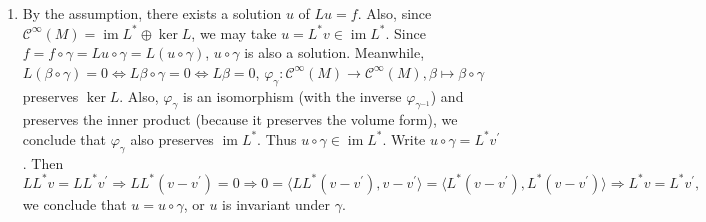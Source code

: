 \begin{enumerate}
On the other hand, by 6.16(15),
\[\operatorname{const}\|\varphi_{n}\|_{1}^{2} \leq\|\varphi_{n}\|^{2}
+\left\|\frac{\partial \varphi_{n}}{\partial x}\right\|^{2}
+\left\|\frac{\partial \varphi_{n}}{\partial y}\right\|^{2}.\]
Since $\{\varphi_{n}\}$ is monotonically increasing, 
\[\|\varphi_{n}\|^{2} \rightarrow \int_{r \leq \frac{1}{2}}\left(\log \log \frac{1}{r}\right)^{2} dx dy<\infty\]
by the monotone convergence theorem. Also,
\[\frac{\partial \varphi_{n}}{\partial x}=\frac{x}{r\left(\frac{1}{n}+r\right)\log \left(\frac{1}{n}+r\right)}\]
and we can use a similar argument to see that
\[\left\|\frac{\partial \varphi_{n}}{\partial x}\right\|^{2} 
\rightarrow \int_{r \leq \frac{1}{2}}\left(\frac{x}{r^{2} \log r}\right)^{2} dx dy=\frac{\pi}{\log 2}.\]
Similarly,
\[\left\|\frac{\partial \varphi_{n}}{\partial y}\right\|^{2} \rightarrow \frac{\pi}{\log 2}.\]
Thus $\|\varphi_{n}\|_{1}$ is bounded and there is no constant $c$ satisfying the given condition.
\item By the assumption, there exists a solution $u$ of $Lu=f$. 
Also, since $\mathcal{C}^{\infty}(M)=\operatorname{im} L^{*} \oplus \ker L$, 
we may take $u=L^{*} v \in \operatorname{im} L^{*}$. 
Since $f=f \circ \gamma=L u \circ \gamma=L(u \circ \gamma)$, $u \circ \gamma$ is also a solution. 
Meanwhile, $L(\beta \circ \gamma)=0 \Leftrightarrow L \beta \circ \gamma=0 \Leftrightarrow L \beta=0$, 
$\varphi_{\gamma}\colon \mathcal{C}^{\infty}(M) \rightarrow \mathcal{C}^{\infty}(M), \beta \mapsto \beta \circ \gamma$ preserves $\ker L$. 
Also, $\varphi_{\gamma}$ is an isomorphism (with the inverse $\varphi_{\gamma^{-1}}$) and preserves the inner product (because it preserves the volume form), 
we conclude that $\varphi_{\gamma}$ also preserves $\operatorname{im} L^{*}$. 
Thus $u \circ \gamma \in \operatorname{im} L^{*}$. Write $u \circ \gamma=L^{*} v^{\prime}$. Then
\[LL^{*}v=LL^{*}v^{\prime} \Rightarrow LL^{*}(v-v^{\prime})=0 
\Rightarrow 0=\langle LL^{*}(v-v^{\prime}), v-v^{\prime}\rangle
=\langle L^{*}(v-v^{\prime}), L^{*}(v-v^{\prime})\rangle 
\Rightarrow L^{*}v=L^{*}v^{\prime},\]
we conclude that $u=u \circ \gamma$, or $u$ is invariant under $\gamma$.
\end{enumerate}